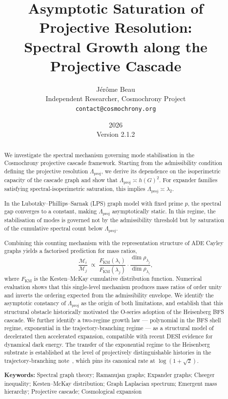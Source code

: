 \documentclass[12pt, a4paper]{article}
\title{Asymptotic Saturation of Projective Resolution:\\
Spectral Growth along the Projective Cascade}
\author{J\'er\^ome Beau\\[4pt]
\small Independent Researcher, Cosmochrony Project\\
\small \texttt{contact@cosmochrony.org}}
\date{2026\\[2pt]\small Version 2.1.2}
\theoremstyle{plain}
\theoremstyle{definition}
\theoremstyle{remark}
\begin{document}
  \maketitle

  \begin{abstract}
    We investigate the spectral mechanism governing mode stabilisation in the
    Cosmochrony projective cascade framework.
    Starting from the admissibility condition defining the projective resolution
    $\Lambda_{\mathrm{proj}}$, we derive its dependence on the isoperimetric
    capacity of the cascade graph and show that
    $\Lambda_{\mathrm{proj}} \asymp h(G)^2$.
    For expander families satisfying spectral-isoperimetric saturation, this
    implies $\Lambda_{\mathrm{proj}} \asymp \lambda_2$.

    In the Lubotzky--Phillips--Sarnak (LPS) graph model with fixed prime $p$,
    the spectral gap converges to a constant, making $\Lambda_{\mathrm{proj}}$
    asymptotically static.
    In this regime, the stabilisation of modes is governed not by the admissibility
    threshold but by saturation of the cumulative spectral count below
    $\Lambda_{\mathrm{proj}}$.

    Combining this counting mechanism with the representation structure of ADE
    Cayley graphs yields a factorised prediction for mass ratios,
    \[
      \frac{\mathcal{M}_i}{\mathcal{M}_j}
      \;\propto\;
      \frac{F_{\mathrm{KM}}(\lambda_i)}{F_{\mathrm{KM}}(\lambda_j)}
      \cdot
      \frac{\dim\rho_{\lambda_j}}{\dim\rho_{\lambda_i}},
    \]
    where $F_{\mathrm{KM}}$ is the Kesten--McKay cumulative distribution function.
    Numerical evaluation shows that this single-level mechanism produces mass
    ratios of order unity and inverts the ordering expected from the admissibility
    envelope.
    We identify the asymptotic constancy of $\Lambda_{\mathrm{proj}}$ as the
    origin of both limitations, and establish that this structural obstacle
    historically motivated the O-series adoption of the Heisenberg BFS cascade.
    We further identify a two-regime growth law --- polynomial in the BFS shell
    regime, exponential in the trajectory-branching regime --- as a structural
    model of decelerated then accelerated expansion, compatible with recent DESI
    evidence for dynamical dark energy.
    The transfer of the exponential regime to the Heisenberg substrate is
    established at the level of projectively distinguishable histories in the
    trajectory-branching note~\cite{Beau2026tb}, which pins its canonical rate at
    $\log(1+\sqrt{2})$.

    \medskip
    \noindent\textbf{Keywords:}
    Spectral graph theory; Ramanujan graphs; Expander graphs; Cheeger inequality;
    Kesten--McKay distribution; Graph Laplacian spectrum; Emergent mass hierarchy;
    Projective cascade; Cosmological expansion
  \end{abstract}
\end{document}
